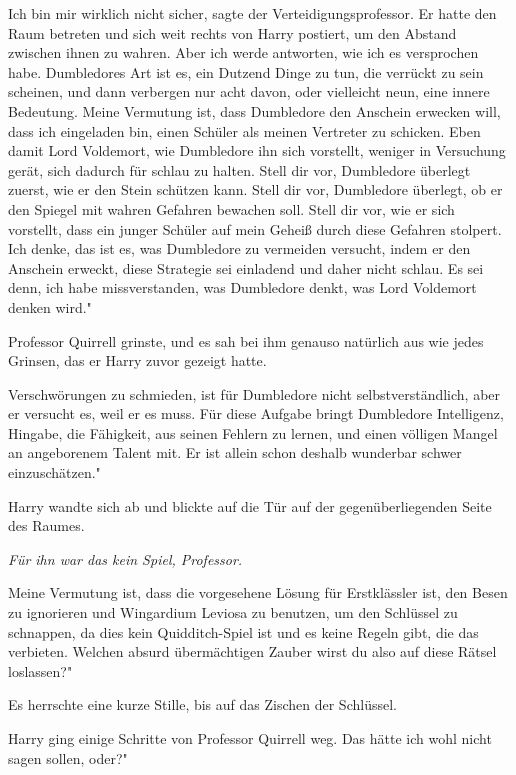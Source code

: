 \glqq{}Ich bin mir wirklich nicht sicher\grqq{}, sagte der
Verteidigungsprofessor. Er hatte den Raum betreten und sich weit rechts von
Harry postiert, um den Abstand zwischen ihnen zu wahren. \glqq{}Aber ich werde
antworten, wie ich es versprochen habe. Dumbledores Art ist es, ein Dutzend
Dinge zu tun, die verrückt zu sein scheinen, und dann verbergen nur acht davon,
oder vielleicht neun, eine innere Bedeutung. Meine Vermutung ist, dass
Dumbledore den Anschein erwecken will, dass ich eingeladen bin, einen Schüler
als meinen Vertreter zu schicken. Eben damit Lord Voldemort, wie Dumbledore ihn
sich vorstellt, weniger in Versuchung gerät, sich dadurch für schlau zu halten.
Stell dir vor, Dumbledore überlegt zuerst, wie er den Stein schützen kann. Stell
dir vor, Dumbledore überlegt, ob er den Spiegel mit wahren Gefahren bewachen
soll. Stell dir vor, wie er sich vorstellt, dass ein junger Schüler auf mein
Geheiß durch diese Gefahren stolpert. Ich denke, das ist es, was Dumbledore zu
vermeiden versucht, indem er den Anschein erweckt, diese Strategie sei einladend
und daher nicht schlau. Es sei denn, ich habe missverstanden, was Dumbledore
denkt, was Lord Voldemort denken wird."

Professor Quirrell grinste, und es sah bei ihm genauso natürlich aus wie jedes
Grinsen, das er Harry zuvor gezeigt hatte.

\glqq{}Verschwörungen zu schmieden, ist für Dumbledore nicht selbstverständlich,
aber er versucht es, weil er es muss. Für diese Aufgabe bringt Dumbledore
Intelligenz, Hingabe, die Fähigkeit, aus seinen Fehlern zu lernen, und einen
völligen Mangel an angeborenem Talent mit. Er ist allein schon deshalb wunderbar
schwer einzuschätzen."

Harry wandte sich ab und blickte auf die Tür auf der gegenüberliegenden Seite
des Raumes.

\emph{Für ihn war das kein Spiel, Professor.}

\glqq{}Meine Vermutung ist, dass die vorgesehene Lösung für Erstklässler ist, den
Besen zu ignorieren und Wingardium Leviosa zu benutzen, um den Schlüssel zu
schnappen, da dies kein Quidditch-Spiel ist und es keine Regeln gibt, die das
verbieten. Welchen absurd übermächtigen Zauber wirst du also auf diese Rätsel
loslassen?"

Es herrschte eine kurze Stille, bis auf das Zischen der Schlüssel.

Harry ging einige Schritte von Professor Quirrell weg. \glqq{}Das hätte ich wohl
nicht sagen sollen, oder?"

